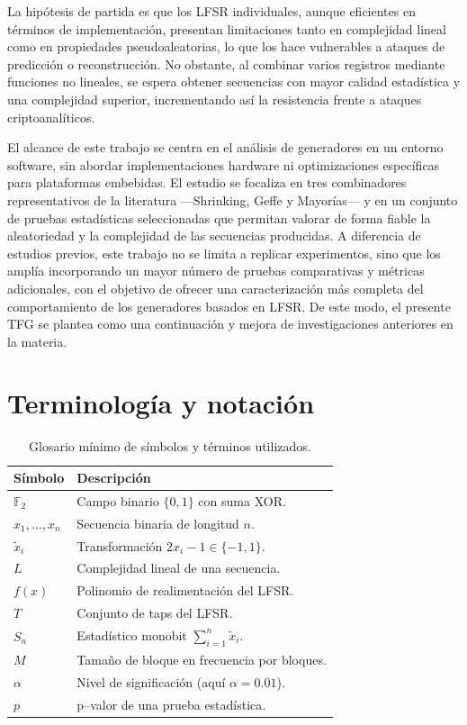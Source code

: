 La hipótesis de partida es que los LFSR individuales, aunque eficientes en
términos de implementación, presentan limitaciones tanto en complejidad lineal
como en propiedades pseudoaleatorias, lo que los hace vulnerables a ataques de
predicción o reconstrucción. No obstante, al combinar varios registros mediante
funciones no lineales, se espera obtener secuencias con mayor calidad
estadística y una complejidad superior, incrementando así la resistencia frente
a ataques criptoanalíticos.

El alcance de este trabajo se centra en el análisis de generadores en un entorno
software, sin abordar implementaciones hardware ni optimizaciones específicas
para plataformas embebidas. El estudio se focaliza en tres combinadores
representativos de la literatura —Shrinking, Geffe y Mayorías— y en un conjunto
de pruebas estadísticas seleccionadas que permitan valorar de forma fiable la
aleatoriedad y la complejidad de las secuencias producidas. A diferencia de
estudios previos, este trabajo no se limita a replicar experimentos, sino que
los amplía incorporando un mayor número de pruebas comparativas y métricas
adicionales, con el objetivo de ofrecer una caracterización más completa del
comportamiento de los generadores basados en LFSR. De este modo, el presente TFG
se plantea como una continuación y mejora de investigaciones anteriores en la
materia.

\section*{Terminología y notación}

\begin{table}[h]
\centering
\begin{tabular}{ll}
\toprule
Símbolo & Descripción \\
\midrule
$\mathbb{F}_2$ & Campo binario $\{0,1\}$ con suma XOR. \\
$x_1,\dots,x_n$ & Secuencia binaria de longitud $n$. \\
$\tilde{x}_i$ & Transformación $2x_i-1\in\{-1,1\}$. \\
$L$ & Complejidad lineal de una secuencia. \\
$f(x)$ & Polinomio de realimentación del LFSR. \\
$T$ & Conjunto de taps del LFSR. \\
$S_n$ & Estadístico monobit $\sum_{i=1}^n \tilde{x}_i$. \\
$M$ & Tamaño de bloque en frecuencia por bloques. \\
$\alpha$ & Nivel de significación (aquí $\alpha=0{.}01$). \\
$p$ & p--valor de una prueba estadística. \\
\bottomrule
\end{tabular}
\caption{Glosario mínimo de símbolos y términos utilizados.}
\end{table}

